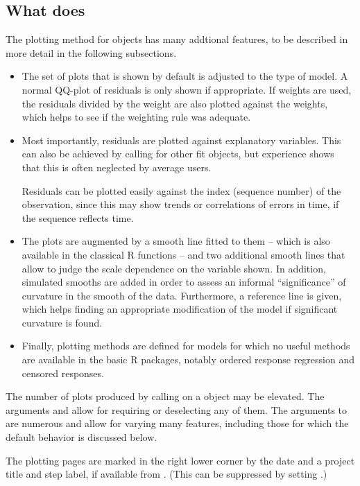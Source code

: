 \documentclass[11pt]{article}\usepackage[]{graphicx}\usepackage[]{color}
\begin{document}
\subsection{What  does}
The plotting method for  objects has many addtional features, to be
described in more detail in the following subsections.
\begin{itemize}
\item
The set of plots that is shown by default is adjusted to the type of
model. A normal QQ-plot of residuals is only shown if appropriate.
If weights are used, the residuals divided by the weight 
are also plotted against the
weights, which helps to see if the weighting rule was adequate.
\item 
Most importantly, residuals are plotted against explanatory variables.
This can also be achieved by calling  for other fit objects,  
but experience shows that this is often neglected by average users.

Residuals can be plotted easily against the index (sequence
number) of the observation, since this may show trends or 
correlations of errors in time, if the sequence reflects time.
\item
The plots are augmented by a smooth line fitted to them -- which is also
available in the classical R functions -- and two additional smooth lines
that allow to judge the scale dependence on the variable shown.
In addition, simulated smooths are added in order to assess an informal 
``significance'' of curvature in the smooth of the data. 
Furthermore, a reference line is given, which helps finding
an appropriate modification of the model if significant curvature is
found. 
\item
Finally, plotting methods are defined for models for which no useful 
methods are available in the basic R packages, notably ordered response
regression and censored responses.
\end{itemize}

The number of plots produced by calling  on a  object may
be elevated. The arguments  and  allow for 
requiring or deselecting any of them. 
The arguments to  are numerous and allow for varying many
features, including those for which the default behavior is discussed below.

The plotting pages are marked in the right lower corner by the date and a
project title and step label, if available from . 
(This  can be suppressed by setting .) 
\end{document}
